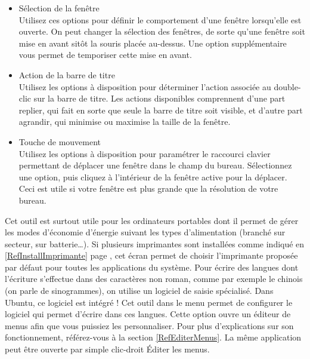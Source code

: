 \begin{itemize}
\item Sélection de la fenêtre\\
Utilisez ces options pour définir le comportement d'une fenêtre lorsqu'elle est ouverte. On peut changer la sélection des fenêtres, de sorte qu'une fenêtre soit mise en avant sitôt la souris placée au-dessus. Une option supplémentaire vous permet de temporiser cette mise en avant. 
\item Action de la barre de titre\\
Utilisez les options à disposition pour déterminer l'action associée au double-clic sur la barre de titre. Les actions disponibles comprennent d'une part replier, qui fait en sorte que seule la barre de titre soit visible, et d'autre part agrandir, qui minimise ou maximise la taille de la fenêtre. 
\item Touche de mouvement\\
Utilisez les options à disposition pour paramétrer le raccourci clavier permettant de déplacer une fenêtre dans le champ du bureau. Sélectionnez une option, puis cliquez à l'intérieur de la fenêtre active pour la déplacer. Ceci est utile si votre fenêtre est plus grande que la résolution de votre bureau. 
\end{itemize}
Cet outil est surtout utile pour les ordinateurs portables dont il permet de gérer les modes d'économie d'énergie suivant les types d'alimentation (branché sur secteur, sur batterie\ldots{}).
Si plusieurs imprimantes sont installées comme indiqué en \ref{RefInstallImprimante} page \pageref{RefInstallImprimante}, cet écran permet de choisir l'imprimante proposée par défaut pour toutes les applications du système.
Pour écrire des langues dont l'écriture s'effectue dans des caractères non roman, comme par exemple le chinois (on parle de sinogrammes), on utilise un logiciel de saisie spécialisé. Dans Ubuntu, ce logiciel est intégré ! Cet outil dans le menu permet de configurer le logiciel qui permet d'écrire dans ces langues.
Cette option ouvre un éditeur de menus afin que vous puissiez les personnaliser. Pour plus d'explications sur son fonctionnement, référez-vous à la section \ref{RefEditerMenus}. La même application peut être ouverte par simple clic-droit \FlecheDroite Éditer les menus.
